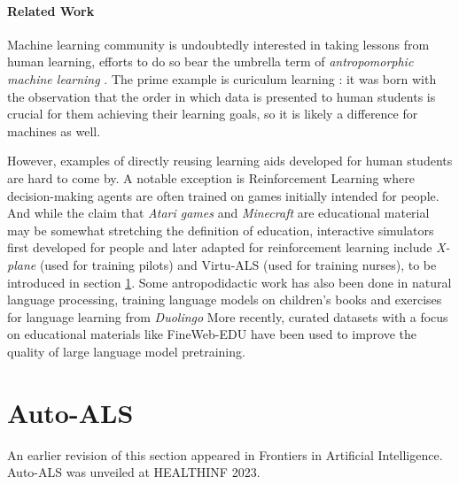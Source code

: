 \paragraph{Related Work}

Machine learning community is undoubtedly interested in taking lessons from human learning, efforts to do so bear the umbrella term of \emph{antropomorphic
machine learning} \cite{angelovAnthropomorphicMachineLearning2018}. The prime example is curiculum learning \cite{sovianyCurriculumLearningSurvey2022, zhouCurBenchCurriculumLearning2024}: it was born with the observation that the order in which data is presented to human students is crucial for them achieving their learning goals, so it is likely a difference for machines as well.

However, examples of directly reusing learning aids developed for human students are hard to come by. A notable exception is Reinforcement Learning where decision-making agents are often trained on games initially intended for people. And while the claim that \emph{Atari games} \cite{mnihPlayingAtariDeep2013} and 
\emph{Minecraft} \cite{hofmannMinecraftAIPlayground2019} are educational material may be somewhat stretching the definition of education, interactive simulators first developed for people and later adapted for reinforcement learning include \emph{X-plane} \cite{staudingerXPlaneMLEnvironmentLearning2018} (used for training pilots) and Virtu-ALS (used for training nurses), to be introduced in section \ref{sec:auto-als}. 
Some antropodidactic work has also been done in natural language processing, training language models on children's books \cite{mayhewSimultaneousTranslationParaphrase2020} and exercises for language learning from \emph{Duolingo} \cite{mayhewSimultaneousTranslationParaphrase2020}
More recently, curated datasets with a focus on educational materials like FineWeb-EDU \cite{penedoFineWebDatasetsDecanting2024} have been used to improve the quality of large language model pretraining.

\newpage
\section{Auto-ALS}
\label{sec:auto-als}

\begin{remark}
  An earlier revision of this section \cite[section 3.1]{liventsevEffectivePatientSimulators2021} appeared in Frontiers in Artificial Intelligence. Auto-ALS \cite{liventsevVadim0x60Autoals2024} was unveiled at HEALTHINF 2023.
\end{remark}

